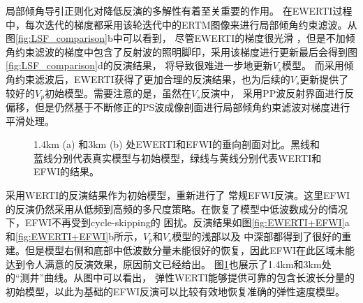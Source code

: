 局部倾角导引正则化对降低反演的多解性有着至关重要的作用。
在EWERTI过程中，每次迭代的梯度都采用该轮迭代中的ERTM图像来进行局部倾角约束滤波。从图\ref{fig:LSF_comparison}b中可以看到，
尽管EWERTI的梯度很光滑
，但是不加倾角约束滤波的梯度中包含了反射波的照明脚印，采用该梯度进行更新最后会得到图\ref{fig:LSF_comparison}d的反演结果，
将导致很难进一步地更新$V_s$模型。
而采用倾角约束滤波后，EWERTI获得了更加合理的反演结果，也为后续的$V_s$更新提供了较好的$V_p$初始模型。需要注意的是，虽然在$V_s$反演中，
采用PP波反射界面进行反偏移，但是仍然基于不断修正的PS波成像剖面进行局部倾角约束滤波对梯度进行平滑处理。
\begin{figure}[!htb]
   \centering
   \caption{
	   1.4km (a) 和3km (b) 处EWERTI和EFWI的垂向剖面对比。黑线和蓝线分别代表真实模型与初始模型，绿线与黄线分别代表WERTI和EFWI的结果。
   }
   \label{fig:Profiles}
\end{figure}

采用WERTI的反演结果作为初始模型，重新进行了
常规EFWI反演。这里EFWI的反演仍然采用从低频到高频的多尺度策略。在恢复了模型中低波数成分的情况下，EFWI不再受到cycle-skipping的
困扰。反演结果如图\ref{fig:EWERTI+EFWI}a和\ref{fig:EWERTI+EFWI}b所示，$V_p$和$V_s$模型的浅部以及
中深部都得到了很好的重建。但是模型右侧和底部中低波数分量未能很好的恢复，因此EFWI在此区域未能达到令人满意的反演效果，原因前文已经给出。
图\ref{fig:Profiles}也展示了1.4km和3km处
的“测井”曲线。从图中可以看出，
弹性WERTI能够提供可靠的包含长波长分量的初始模型，以此为基础的EFWI反演可以比较有效地恢复准确的弹性速度模型。

